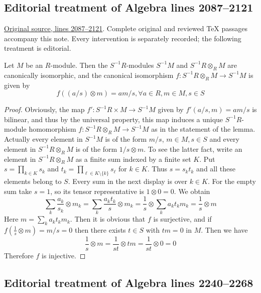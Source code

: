 \subsection{Editorial treatment of Algebra lines 2087--2121}

\hypertarget{algebra-context-007}{}

\noindent\href{https://github.com/stacks/stacks-project/blob/a04446e57ec1fbc252a871afcec7752fb2807b14/algebra.tex\#L2087}{Original source, lines 2087--2121}. Complete original and reviewed TeX passages accompany this note. Every intervention is separately recorded; the following treatment is editorial.


\begin{lemma}
\label{editorial-source-lemma-tensor-localization}
Let $M$ be an $R$-module. Then the $S^{-1}R$-modules $S^{-1}M$
and $S^{-1}R \otimes_R M$ are canonically isomorphic, and the
canonical isomorphism $f : S^{-1}R \otimes_R M \to S^{-1}M$
is given by
$$
f((a/s) \otimes m) = am/s, \forall a \in R, m \in M, s \in S
$$
\end{lemma}

\begin{proof}
Obviously, the map
$f' : S^{-1}R \times M \to S^{-1}M$ given by $f'(a/s, m) = am/s$ is
bilinear, and thus by the
universal property, this map induces a unique $S^{-1}R$-module homomorphism
$f : S^{-1}R \otimes_R M \to S^{-1}M$ as in the statement of the lemma.
Actually every element in $S^{-1}M$ is of the form $m/s$, $m\in M, s\in S$ and
every element in
$S^{-1}R \otimes_R M$ is of the form $1/s \otimes m$. To see the latter fact,
write an element in $S^{-1}R\otimes_R M$ as a finite sum
indexed by a finite set $K$. Put
$s = \prod_{k\in K}s_k$ and
$t_k = \prod_{\ell\in K\setminus\{k\}}s_\ell$ for $k\in K$.
Thus $s=s_kt_k$ and all these elements belong to $S$.
Every sum in the next display is over $k\in K$.
For the empty sum take $s=1$, so its tensor representative is
$1\otimes 0=0$. We obtain
$$
\sum_k \frac{a_k}{s_k} \otimes m_k =
\sum_k \frac{a_k t_k}{s} \otimes m_k =
\frac{1}{s} \otimes \sum_k {a_k t_k}m_k = \frac{1}{s} \otimes m
$$
Here $m = \sum_k {a_k t_k}m_k$. Then it is obvious that $f$ is surjective,
and if $f(\frac{1}{s} \otimes m) = m/s = 0$ then there exists $t \in S$ with
$tm = 0$ in $M$. Then we have
$$
\frac{1}{s} \otimes m = \frac{1}{st} \otimes tm = \frac{1}{st} \otimes 0 = 0
$$
Therefore $f$ is injective.
\end{proof}


\subsection{Editorial treatment of Algebra lines 2240--2268}

